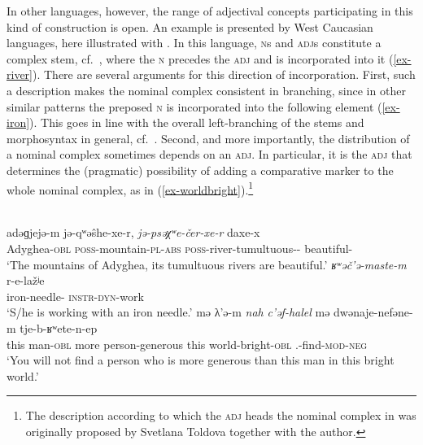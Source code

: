 \documentclass[output=paper
  ,nobabel
  ,draftmode
  ,colorlinks, citecolor=brown
]{langscibook}
\begin{document}
\largerpage[-1]
In other languages, however, the range of adjectival concepts participating in this kind of construction is open. An example is presented by West Caucasian languages, here illustrated with . In this language, \textsc{n}s and \textsc{adj}s constitute a complex stem, cf.\ \citet{Lander2017}, where the \textsc{n} precedes the \textsc{adj}  and is incorporated into it (\ref{ex-river}). There are several arguments for this direction of incorporation. First, such a description makes the nominal complex consistent in branching, since in other similar patterns the preposed \textsc{n} is incorporated into the following element (\ref{ex-iron}). This goes in line with the overall left-branching of the  stems and morphosyntax in general, cf.\ \citet{KorotkovaLander2010}.  
Second, and more importantly, the distribution of a nominal complex sometimes depends on an \textsc{adj}. In particular, it is the \textsc{adj} that determines the (pragmatic) possibility of adding a comparative marker to the whole nominal complex, as in (\ref{ex-worldbright}).\footnote{The description according to which the \textsc{adj} heads the nominal complex in  was originally proposed by Svetlana Toldova together with the author.}

\newpage
\ea
{}\\
\ea
\label{ex-river}	
\gll adəɡjejə-m	    jə-qʷəŝhe-xe-r,    \emph{jə-psəχʷe-čer-xe-r}   		daxe-x\\
     Adyghea-\textsc{obl}   \textsc{poss}-mountain-\textsc{pl}-\textsc{abs} \textsc{poss}-river-tumultuous-\PL-\ABS{}	beautiful-\PL\\
\glt `The mountains of Adyghea, its tumultuous rivers are 	beautiful.'
\ex\label{ex-iron}
\gll	\emph{ʁʷəč’ə-maste-m}	r-e-lažʲe\\
		iron-needle-\OBL{}	\textsc{instr}-\textsc{dyn}-work\\
\glt `S/he is working with an iron needle.'
\ex\label{ex-worldbright}
\gll	mə	λ’ə-m	\emph{nah}	\emph{c’əf-halel}	mə	dwənaje-nefəne-m      		tje-b-ʁʷete-n-ep\\
	this	man-\textsc{obl} more	person-generous	this	world-bright-\textsc{obl}		\SG.\ERG-find-\textsc{mod}-\textsc{neg}\\
\glt `You will not find a person who is more generous than this man in this bright world.'

\z
\z
\end{document}
